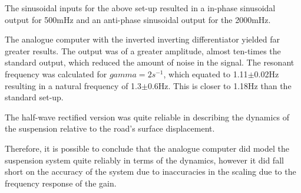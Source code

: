 \documentclass[journal]{Imperial_lab_report}
\begin{document}
    The sinusoidal inputs for the above set-up resulted in a in-phase sinusoidal output for 500mHz and an anti-phase sinusoidal output for the 2000mHz.

    The analogue computer with the inverted inverting differentiator yielded far greater results. The output was of a greater amplitude, almost ten-times the standard output, which reduced the amount of noise in the signal. The resonant frequency was calculated for $gamma = 2$$s^{-1}$, which equated to 1.11$\pm$0.02Hz resulting in a natural frequency of 1.3$\pm$0.6Hz. This is closer to 1.18Hz than the standard set-up.

    The half-wave rectified version was quite reliable in describing the dynamics of the suspension relative to the road's surface displacement.

    Therefore, it is possible to conclude that the analogue computer did model the suspension system quite reliably in terms of the dynamics, however it did fall short on the accuracy of the system due to inaccuracies in the scaling due to the frequency response of the gain.
\end{document}
